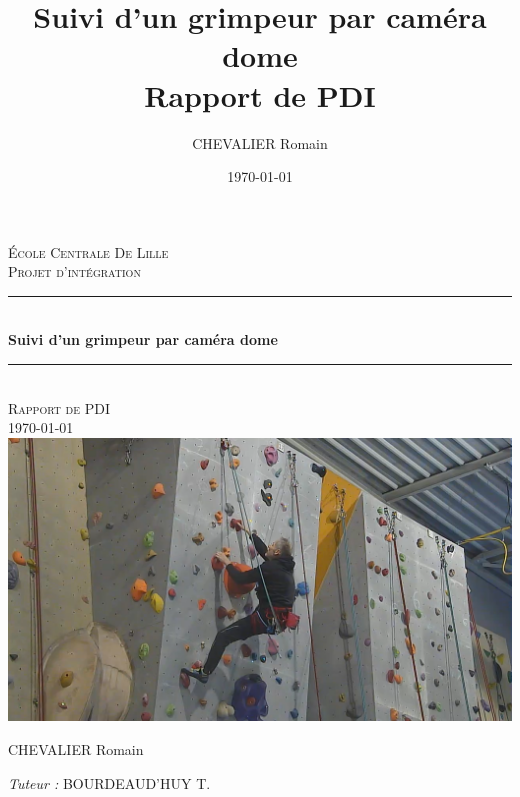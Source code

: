 \documentclass[a4paper, 11pt, french]{article}
\title{%
        \Huge Suivi d'un grimpeur par caméra dome \\
        \LARGE Rapport de PDI}
\author{\LARGE CHEVALIER Romain}
\date{\today}
\newcommand{\HRule}{\rule{\linewidth}{0.5mm}}
\begin{document}
\begin{titlepage}

    \begin{titlepage}
        \begin{center}
      
      
          \textsc{\LARGE École Centrale De Lille}\\[2cm]
      
          \textsc{\huge Projet d'intégration}\\[2cm]
      
          \HRule \\[0.4cm]
          { \Huge \bfseries Suivi d'un grimpeur par caméra dome\\[0.4cm] }
      
          \HRule \\[2cm]

          \textsc{\Large Rapport de PDI \\} {\large\today}\\[1.5cm]
          
          \vfill
          \includegraphics[width=.8\textwidth]{exemplePaysage.png}
          \vfill
 
          \begin{minipage}{0.4\textwidth}
            \begin{flushleft} \large
              CHEVALIER Romain\\
            \end{flushleft}
          \end{minipage}
          \begin{minipage}{0.4\textwidth}
            \begin{flushright} \large
              \emph{Tuteur :}  BOURDEAUD'HUY T. \\
            \end{flushright}
          \end{minipage}
      
          \vspace{1cm}
         
        \end{center}
      \end{titlepage}
    
    \normalsize
   
\end{titlepage}
\end{document}
